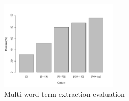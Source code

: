 \documentclass[Journal,InsideFigs, DoubleSpace]{ascelike} %
\begin{document}
{\begin{table} [t]
	\normalsize
\end{table}

\begin{figure}[t]
	\centering
	\includegraphics[width=0.5\textwidth]{Figure3_term_precision}
	\caption{Multi-word term extraction evaluation}
	\label{fig:term_precision}
\end{figure}
%
}
\end{document}
